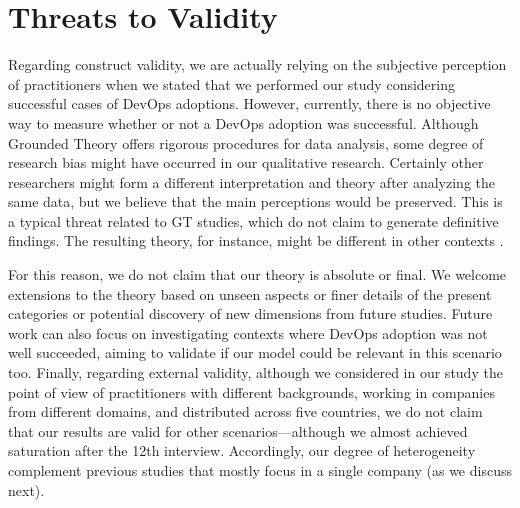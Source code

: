 \section{Threats to Validity}

Regarding construct validity,  we are actually relying on the subjective perception of
practitioners when we stated that we performed our study considering successful cases
of DevOps adoptions. However, currently, there is no objective way to measure whether or not a
DevOps adoption was successful.
Although Grounded Theory offers rigorous procedures for data analysis, some degree of research bias
might have occurred in our qualitative research. Certainly other researchers might form a different
interpretation and theory after analyzing the same data,  but we believe that the main perceptions
would be preserved. This is a typical threat related to GT
studies, which do not claim to generate definitive findings. The resulting theory, for instance, might
be different in other contexts \cite{hoda2012developing}.

For this reason, we do not claim
that our theory is absolute or final. We welcome extensions to the theory based
on unseen aspects or finer details of the present categories or potential discovery
of new dimensions from future studies.
Future work can also focus on investigating contexts
where DevOps adoption was not well succeeded, aiming to validate if our model could be
relevant in this scenario too. Finally, regarding external validity, although we
considered in our study the point of view of practitioners with different
backgrounds, working in companies from different domains, and distributed across
five countries, we do not claim that our results are valid for
other scenarios---although we almost achieved saturation
after the 12th interview. Accordingly, our degree of heterogeneity complement
previous studies that mostly focus in a single company (as we discuss next).
